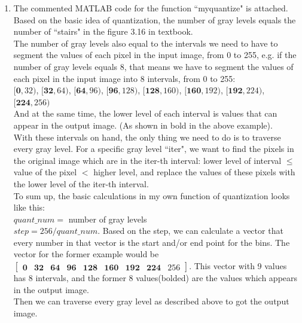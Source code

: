 \documentclass[a4paper]{article}
\begin{document}
\begin{spacing}{2.0}
\begin{enumerate}
	
	\item The commented MATLAB code for the function ``myquantize" is attached.\\
		 Based on the basic idea of quantization, the number of gray levels equals the number of ``stairs" in the figure 3.16 in textbook.\\
		 The number of gray levels also equal to the intervals we need to have to segment the values of each pixel in the input image, from 0 to 255, 		 e.g. if the number of gray levels equals 8, that means we have to segment the values of each pixel in the input image into 8 intervals, from 0 		 to 255:\\
		 $[\mathbf{0}, 32)$, $[\mathbf{32}, 64)$, $[\mathbf{64}, 96)$, $[\mathbf{96}, 128)$, $[\mathbf{128}, 160)$, $[\mathbf{160}, 192)$, $				[\mathbf{192}, 224)$,  $[\mathbf{224}, 256)$ \\
		 And at the same time, the lower level of each interval is values that can appear in the output image. (As shown in bold in the above example).		\\
		 With these intervals on hand, the only thing we need to do is to traverse every gray level. For a specific gray level ``iter", we want to find the 			pixels in the original image which are in the iter-th interval: lower level of interval $\leq$value of the pixel $\mathbf{<}$ higher level, and replace the values of these pixels with the lower level of the iter-th interval.\\
		 To sum up, the basic calculations in my own function of quantization looks like this:\\
		 $quant\_num =$ number of gray levels\\
		 $step =256/quant\_num$. Based on the step, we can calculate a vector that every number in that vector is the start and/or end point for the 		bins. The vector for the former example would be $\left[\begin{matrix} \mathbf{0} & \mathbf{32} & \mathbf{64} & \mathbf{96} & \mathbf{128} & 			\mathbf{160} & \mathbf{192} & \mathbf{224} & 256 \end{matrix}\right]$. This vector with 9 values has 8 intervals, and the former 8 values(bolded) are 	the values which appears in the output image. \\
		Then we can traverse every gray level as described above to got the output image.
	
	\end{enumerate}



	
\end{spacing}
\end{document}

